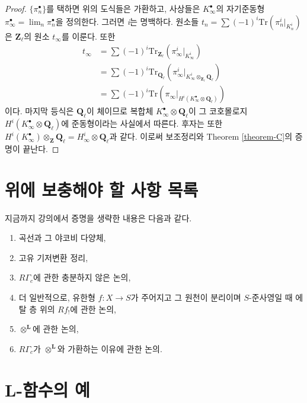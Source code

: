 \begin{proof}
$\{\pi_n^\bullet\}$를 택하면 위의 도식들은 가환하고, 사상들은
$K_\infty^\bullet$의 자기준동형
$\pi_\infty^\bullet = \lim_n\pi_n^\bullet$을 정의한다.
그러면 {\it i}는 명백하다. 원소들
$t_n = \sum(-1)^i \text{Tr}\left(\pi_n^i |_{K_n^i}\right)$은
$\mathbf{Z}_\ell$의 원소 $t_\infty$를 이룬다. 또한
\begin{align*}
t_\infty
& =
\sum (-1)^i \text{Tr}_{\mathbf{Z}_\ell}(\pi_\infty^i |_{K_\infty^i}) \\
& =
\sum (-1)^i \text{Tr}_{\mathbf{Q}_\ell}(
\pi_\infty^i |_{K_\infty^i \otimes_{\mathbf{Z}_\ell}\mathbf{Q}_\ell}) \\
& =
\sum (-1)^i \text{Tr}(
\pi_\infty |_{H^i(K_\infty^\bullet \otimes \mathbf{Q}_\ell)})
\end{align*}
이다. 마지막 등식은 $\mathbf{Q}_\ell$이 체이므로 복합체
$K_\infty^\bullet \otimes \mathbf{Q}_\ell$이 그 코호몰로지
$H^i(K_\infty^\bullet \otimes \mathbf{Q}_\ell)$에 준동형이라는
사실에서 따른다. 후자는 또한
$H^i(K_\infty^\bullet)\otimes_{\mathbf{Z}}\mathbf{Q}_\ell = H_\infty^i \otimes
\mathbf{Q}_\ell$과 같다. 이로써 보조정리와 Theorem
\ref{theorem-C}의 증명이 끝난다.
\end{proof}


\section{위에 보충해야 할 사항 목록}
\label{section-list-skipped}

\noindent
지금까지 강의에서 증명을 생략한 내용은 다음과 같다.
\begin{enumerate}
\item 곡선과 그 야코비 다양체,
\item 고유 기저변환 정리,
\item $R\Gamma_c$에 관한 충분하지 않은 논의,
\item 더 일반적으로, 유한형 $f : X \to S$가 주어지고 그 원천이 분리이며
$S$-준사영일 때 에탈 층 위의 $Rf_!$에 관한 논의,
\item $\otimes^{\mathbf{L}}$에 관한 논의,
\item $R\Gamma_c$가 $\otimes^{\mathbf{L}}$와 가환하는 이유에 관한 논의.
\end{enumerate}






\section{L-함수의 예}
\label{section-examples-L-functions}

